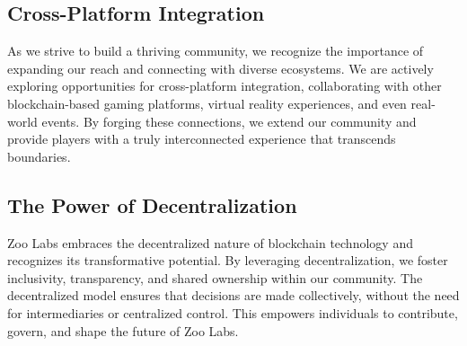 \subsection{Cross-Platform Integration}
As we strive to build a thriving community, we recognize the importance of expanding our reach and connecting with diverse ecosystems. We are actively exploring opportunities for cross-platform integration, collaborating with other blockchain-based gaming platforms, virtual reality experiences, and even real-world events. By forging these connections, we extend our community and provide players with a truly interconnected experience that transcends boundaries.

\subsection{The Power of Decentralization}
Zoo Labs embraces the decentralized nature of blockchain technology and recognizes its transformative potential. By leveraging decentralization, we foster inclusivity, transparency, and shared ownership within our community. The decentralized model ensures that decisions are made collectively, without the need for intermediaries or centralized control. This empowers individuals to contribute, govern, and shape the future of Zoo Labs.
